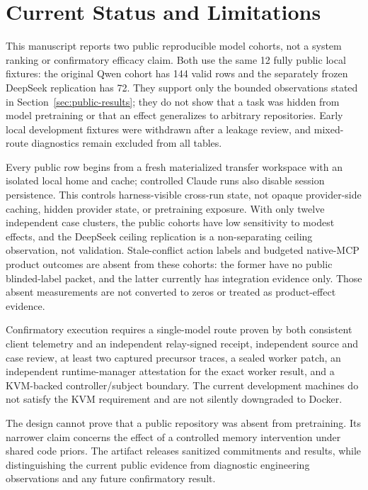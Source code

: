 \section{Current Status and Limitations}

This manuscript reports two public reproducible model cohorts, not a system
ranking or confirmatory efficacy claim. Both use the same 12 fully public local
fixtures: the original Qwen cohort has 144 valid rows and the separately frozen
DeepSeek replication has 72. They support only the bounded observations stated
in Section~\ref{sec:public-results}; they do not show that a task was hidden
from model pretraining or that an effect generalizes to arbitrary repositories.
Early local development fixtures were withdrawn after a leakage review, and
mixed-route diagnostics remain excluded from all tables.

Every public row begins from a fresh materialized transfer workspace with an
isolated local home and cache; controlled Claude runs also disable session
persistence. This controls harness-visible cross-run state, not opaque
provider-side caching, hidden provider state, or pretraining exposure. With
only twelve independent case clusters, the public cohorts have low sensitivity
to modest effects, and the DeepSeek ceiling replication is a non-separating
ceiling observation, not validation. Stale-conflict action labels and budgeted native-MCP product
outcomes are absent from these cohorts: the former have no public blinded-label
packet, and the latter currently has integration evidence only. Those absent
measurements are not converted to zeros or treated as product-effect evidence.

Confirmatory execution requires a single-model route proven by both consistent
client telemetry and an independent relay-signed receipt, independent source
and case review, at least two captured precursor traces, a sealed worker patch,
an independent runtime-manager attestation for the exact worker result, and a
KVM-backed controller/subject boundary. The current development machines do not
satisfy the KVM requirement and are not silently downgraded to Docker.

The design cannot prove that a public repository was absent from pretraining.
Its narrower claim concerns the effect of a controlled memory intervention under
shared code priors. The artifact releases sanitized commitments and results,
while distinguishing the current public evidence from diagnostic engineering
observations and any future confirmatory result.
